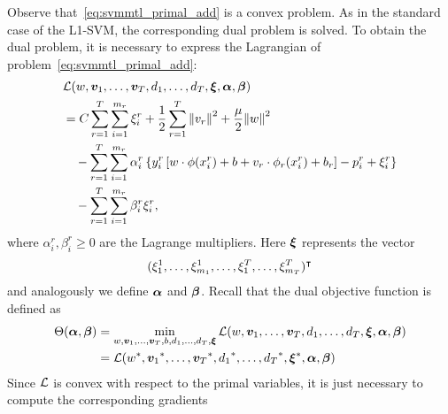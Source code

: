 Observe that~\eqref{eq:svmmtl_primal_add} is a convex problem. As in the standard case of the L1-SVM, the corresponding dual problem is solved. To obtain the dual problem, it is necessary to express the Lagrangian of problem~\eqref{eq:svmmtl_primal_add}:
\begin{equation}\label{eq:svmmtl_lagrangian_add}
    \begin{aligned}
        & \lagr({w}, \fv{v}_1, \ldots, \fv{v}_\ntasks, d_1, \ldots, d_\ntasks, \fv{\xi}, \fv{\alpha}, \fv{\beta}) \\
        &= C \sum_{r= 1}^T \sum_{i=1}^{m_r} {\xi_{i}^r} + \frac{1}{2} \sum_{r= 1}^T{\norm{{v}_r}^2} + \frac{\mu}{2} {\norm{{w}}}^2 \\
        &\quad -  \sum_{r= 1}^T \sum_{i=1}^{m_r} \alpha_i^r \left\lbrace y_{i}^r \left[ {w} \cdot \phi(x_{i}^r) + b  + {v}_r \cdot \phi_r(x_{i}^r) + b_r \right] - p_{i}^r + \xi_{i}^r  \right\rbrace \\
        &\quad -  \sum_{r= 1}^T \sum_{i=1}^{m_r} \beta_i^r \xi_i^r ,
    \end{aligned}
\end{equation}
where $\alpha_i^r, \beta_i^r \geq 0$ are the Lagrange multipliers. Here $\bm{\xi}$ represents the vector $$(\xi_1^1, \ldots, \xi_{m_1}^1, \ldots, \xi_1^T, \ldots, \xi_{m_T}^T)^\intercal$$ and analogously we define $\bm{\alpha}$ and $\bm{\beta}$.
Recall that the dual objective function is defined as 
\begin{equation}\nonumber
    \begin{aligned}
         \Theta(\bm{\alpha}, \bm{\beta}) &=  \min_{{w}, \bm{v}_1, \ldots, \bm{v}_T, b, d_1, \ldots, d_T, \bm{\xi}} \mathcal{L}({w}, \bm{v}_1, \ldots, \bm{v}_T, d_1, \ldots, d_T, \bm{\xi}, \bm{\alpha}, \bm{\beta}) \\
         &= \mathcal{L}({{w}}^*, {\bm{v}_1}^*, \ldots, {\bm{v}_T}^*, {d_1}^*, \ldots, {d_T}^*, {\bm{\xi}}^*, \bm{\alpha}, \bm{\beta})
    \end{aligned}    
\end{equation}
Since $\mathcal{L}$ is convex with respect to the primal variables, it is just necessary to compute the corresponding gradients
